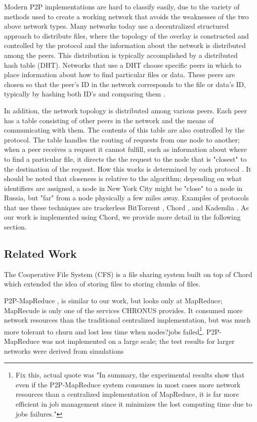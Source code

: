 \documentclass[conference, compsocconf, letterpaper]{IEEEtran}
\begin{document}
Modern P2P implementations are hard to classify easily, due to the variety of methods used to create a working network that avoids the weaknesses of the two above network types.  Many networks today use a decentralized structured approach to distribute files, where the topology of the overlay is constructed and controlled by the protocol and the information about the network is distributed among the peers.  This distribution is typically accomplished by a distributed hash table (DHT).  Networks that use a DHT choose specific peers in which to place information about how to find particular files or data.  These peers are chosen so that the peer's ID in the network corresponds to the file or data's ID, typically by hashing both ID's and comparing them  \cite{SurveyCompare}. 

In addition, the network topology is distributed among various peers.  Each peer has a table consisting of other peers in the network and the means of communicating with them.  The contents of this table are also controlled by the protocol.  The table handles the routing of requests from one node to another; when a peer receives a request it cannot fulfill, such as information about where to find a particular file, it directs the the request to the node that is "closest" to the destination of the request. How this works is determined by each protocol \cite{Chord}.  It should be noted that closeness is relative to the algorithm; depending on what identifiers are assigned, a node in New York City might be "close" to a node in Russia, but "far" from a node physically a few miles away.  Examples of protocols that use these techniques are trackerless BitTorrent \cite{BitTorrent}, Chord \cite{Chord}, and Kademlia \cite{Kademlia}. As our work is implemented using Chord, we provide more detail in the following section. 


\subsection{Related Work}

The Cooperative File System (CFS) is a file sharing system built on top of Chord \cite{CFS} which extended the idea of storing files to storing chunks of files. 

P2P-MapReduce \cite{marozzo2012p2p}, is similar to our work, but looks only at MapReduce; MapRecude is only one of the services CHRONUS provides.  It consumed more network resources than the traditional centralized implementation, but was much more tolerant to churn and lost less time when nodes?jobs failed\footnote{Fix this, actual quote was "In summary, the experimental results show that even if the P2P-MapReduce system consumes in most cases more network resources than a centralized implementation of MapReduce, it is far more efficient in job management since it minimizes the lost computing time due to jobs failures."}.  P2P-MapReduce was not implemented on a large scale; the test results for larger networks were derived from simulations
\end{document}

